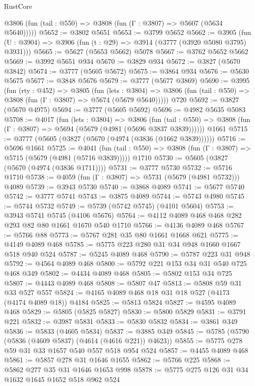 \begin{lexlean}{RustCore}
\begin{coremodule}
      @3806 (fun (tail : @550) => @3808 (fun (Γ : @3807) => @5607 (@5634 @5640)))))
@5652 := @3802 @5651
@5653 := @3799 @5652
@5662 := @3905 (fun (U : @3904) => @3906 (fun (t : @29) => @3914 (@3777 (@3920 @5080 @3795) @3931)))
@5665 := @5627 (@5653 @5662) @5078
@5667 := @3762 @5652 @5662
@5669 := @3992 @5651 @934
@5670 := @3829 @934
@5672 := @3827 (@5670 @3842)
@5674 := @3777 (@5605 @5672)
@5675 := @3864 @934
@5676 := @5630 @5675
@5677 := @3848 @5676
@5679 := @3777 (@5677 @3869)
@5690 := @3995
    (fun (rty : @452) =>
    @3805
      (fun (lets : @3804) =>
      @3806 (fun (tail : @550) => @3808 (fun (Γ : @3807) => @5674 (@5679 @5640)))))
    @720
@5692 := @3827 (@5670 @4975)
@5694 := @3777 (@5605 @5692)
@5696 := @4982 @5635 @5083
@5708 := @4017
    (fun (lets : @3804) =>
    @3806
      (fun (tail : @550) => @3808 (fun (Γ : @3807) => @5694 (@5679 (@4981 (@5696 @3837 @3839))))))
    @1661
@5715 := @3777 (@5605 (@3827 (@5670 (@4974 (@3836 (@1662 @3839))))))
@5716 := @5696 @1661
@5725 := @4041
    (fun (tail : @550) => @3808 (fun (Γ : @3807) => @5715 (@5679 (@4981 (@5716 @3839)))))
    @1710
@5730 := @5605 (@3827 (@5670 (@4974 (@3836 @1711))))
@5731 := @3777 @5730
@5732 := @5716 @1710
@5738 := @4059 (fun (Γ : @3807) => @5731 (@5679 (@4981 @5732))) @4089
@5739 := @3943 @5730
@5740 := @3868 @4089
@5741 := @5677 @5740
@5742 := @3777 @5741
@5743 := @3875 @4089
@5744 := @5743 @4980
@5745 := @5744 @5732
@5749 := @5739 (@5742 @5745) (@4101 @5604)
@5753 := @3943 @5741 @5745 (@4106 @5676)
@5764 := @4112 @4089 @468 @468 @282 @293 @82 @80 @1661 @1670 @540 @1710
@5766 := @4136 @4089 @468
@5767 := @5766 @88
@5773 := @5767 @281 @35 @80 @1661 @1668 @621
@5775 := @4149 @4089 @468
@5785 := @5775 @223 @280 @31 @34 @948 @1660 @1667 @518 @940 @524
@5787 := @5245 @4089 @468
@5790 := @5787 @223 @31 @948
@5792 := @4564 @4089 @468
@5800 := @5792 @221 @153 @34 @31 @540 @725 @468 @349
@5802 := @4434 @4089 @468
@5805 := @5802 @153 @34 @725
@5807 := @4443 @4089 @468
@5808 := @5807 @47
@5813 := @5808 @59 @31 @33 @527 @557
@5824 := @4165 @4089 @468 @18 @31 @18 @527 (@4173 (@4174 @4089 @18)) @4184
@5825 := @5813 @5824
@5827 := @4595 @4089 @468
@5829 := @5805 (@5825 @5827)
@5830 := @5800 @5829
@5831 := @3791 @221
@5832 := @3987 @5831
@5833 := @5830 @5832
@5834 := @3861 @349
@5836 := @5833 (@4605 @5834)
@5837 := @3885 @349
@5845 := @5785 (@5790 (@5836 (@4609 @5837) (@4614 (@4616 @221)) @4623))
@5855 := @5775 @278 @59 @31 @33 @1657 @540 @557 @518 @954 @524
@5857 := @4455 @4089 @468
@5861 := @5857 @278 @31 @1646 @1655
@5862 := @5766 @225
@5868 := @5862 @277 @35 @31 @1646 @1653 @998
@5878 := @5775 @275 @126 @31 @34 @1632 @1645 @1652 @518 @962 @524

\end{coremodule}
\end{lexlean}
